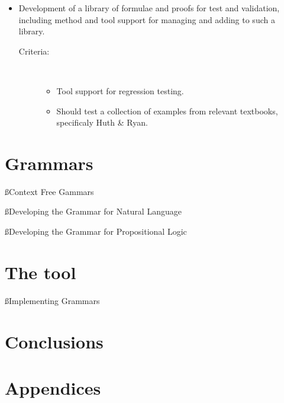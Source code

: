 \documentclass[a4paper]{article}
\begin{document}
\begin{itemize}
\item
    Development of a library of formulae and proofs for test and validation,
    including method and tool support for managing and adding to such a 
    library.
    \begin{description}
        \item[Criteria:]~ \\ \vspace{-5 mm}
            \begin{itemize}
                \item Tool support for regression testing.
                \item Should test a collection of examples from relevant
                textbooks, specificaly Huth \& Ryan\cite{hr}.
            \end{itemize}
    \end{description}
\end{itemize}

\section{Grammars}
\ss{Context Free Gammars}

\ss{Developing the Grammar for Natural Language}



\ss{Developing the Grammar for Propositional Logic}

\section{The tool}
\ss{Implementing Grammars}

\section{Conclusions}


\label{LastBody}
\pagebreak
{}


\label{LastBio}
\pagebreak
\appendix
{}
\section*{Appendices}
\end{document}
